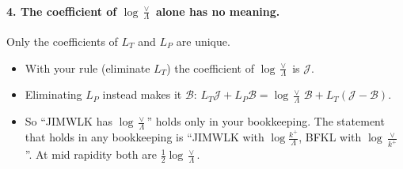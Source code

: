 \documentclass[11pt]{article}
\numberwithin{equation}{section}
\newcommand{\JJ}{\mathcal J}
\newcommand{\BB}{\mathcal B}
\newcommand{\LT}{L_T}
\newcommand{\LP}{L_P}
\begin{document}
\paragraph{4. The coefficient of $\log\frac\vee\Lambda$ alone has no meaning.} Only the coefficients of $\LT$ and $\LP$ are unique.
\begin{itemize}
\item With your rule (eliminate $\LT$) the coefficient of $\log\frac\vee\Lambda$ is $\JJ$.
\item Eliminating $\LP$ instead makes it $\BB$: $\LT\JJ+\LP\BB=\log\frac\vee\Lambda\,\BB+\LT(\JJ-\BB)$.
\item So ``JIMWLK has $\log\frac\vee\Lambda$'' holds only in your bookkeeping. The statement that holds in any bookkeeping is ``JIMWLK with $\log\frac{k^+}{\Lambda}$, BFKL with $\log\frac{\vee}{k^+}$''. At mid rapidity both are $\frac12\log\frac\vee\Lambda$.
\end{itemize}
\end{document}
